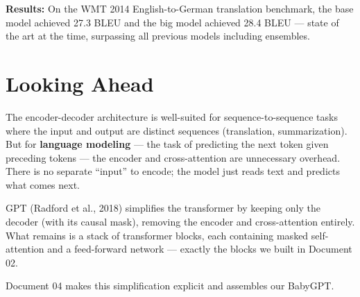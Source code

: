 \textbf{Results:} On the WMT 2014 English-to-German translation benchmark, the base model achieved 27.3 BLEU and the big model achieved 28.4 BLEU --- state of the art at the time, surpassing all previous models including ensembles.

\section{Looking Ahead}

The encoder-decoder architecture is well-suited for sequence-to-sequence tasks where the input and output are distinct sequences (translation, summarization). But for \textbf{language modeling} --- the task of predicting the next token given preceding tokens --- the encoder and cross-attention are unnecessary overhead. There is no separate ``input'' to encode; the model just reads text and predicts what comes next.

GPT (Radford et al., 2018) simplifies the transformer by keeping only the decoder (with its causal mask), removing the encoder and cross-attention entirely. What remains is a stack of transformer blocks, each containing masked self-attention and a feed-forward network --- exactly the blocks we built in Document 02.

Document 04 makes this simplification explicit and assembles our BabyGPT.


